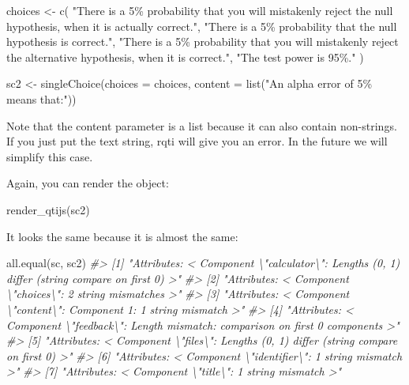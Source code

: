 \documentclass[twoside]{tufte-book}
\newenvironment{Shaded}{}{}
\newcommand{\AttributeTok}[1]{\textcolor[rgb]{0.49,0.56,0.16}{#1}}
\newcommand{\CommentTok}[1]{\textcolor[rgb]{0.38,0.63,0.69}{\textit{#1}}}
\newcommand{\FunctionTok}[1]{\textcolor[rgb]{0.02,0.16,0.49}{#1}}
\newcommand{\NormalTok}[1]{#1}
\newcommand{\OtherTok}[1]{\textcolor[rgb]{0.00,0.44,0.13}{#1}}
\newcommand{\StringTok}[1]{\textcolor[rgb]{0.25,0.44,0.63}{#1}}
\begin{document}
\begin{Shaded}
\begin{Highlighting}[]
\NormalTok{choices }\OtherTok{\textless{}{-}} \FunctionTok{c}\NormalTok{(}
  \StringTok{"There is a 5\% probability that you will mistakenly reject the null}
\StringTok{ hypothesis, when it is actually correct."}\NormalTok{,}
  \StringTok{"There is a 5\% probability that the null hypothesis is correct."}\NormalTok{,}
  \StringTok{"There is a 5\% probability that you will mistakenly reject the alternative}
\StringTok{ hypothesis, when it is correct."}\NormalTok{,}
  \StringTok{"The test power is 95\%."}
\NormalTok{)}

\NormalTok{sc2 }\OtherTok{\textless{}{-}} \FunctionTok{singleChoice}\NormalTok{(}\AttributeTok{choices =}\NormalTok{ choices, }
                    \AttributeTok{content =} \FunctionTok{list}\NormalTok{(}\StringTok{"An alpha error of 5\% means that:"}\NormalTok{))}
\end{Highlighting}
\end{Shaded}

Note that the content parameter is a list because it can also contain non-strings. If you just put the text string, rqti will give you an error. In the future we will simplify this case.

Again, you can render the object:

\begin{Shaded}
\begin{Highlighting}[]
\FunctionTok{render\_qtijs}\NormalTok{(sc2)}
\end{Highlighting}
\end{Shaded}

It looks the same because it is almost the same:

\begin{Shaded}
\begin{Highlighting}[]
\FunctionTok{all.equal}\NormalTok{(sc, sc2)}
\CommentTok{\#\textgreater{} [1] "Attributes: \textless{} Component \textbackslash{}"calculator\textbackslash{}": Lengths (0, 1) differ (string compare on first 0) \textgreater{}"}
\CommentTok{\#\textgreater{} [2] "Attributes: \textless{} Component \textbackslash{}"choices\textbackslash{}": 2 string mismatches \textgreater{}"                                 }
\CommentTok{\#\textgreater{} [3] "Attributes: \textless{} Component \textbackslash{}"content\textbackslash{}": Component 1: 1 string mismatch \textgreater{}"                      }
\CommentTok{\#\textgreater{} [4] "Attributes: \textless{} Component \textbackslash{}"feedback\textbackslash{}": Length mismatch: comparison on first 0 components \textgreater{}"  }
\CommentTok{\#\textgreater{} [5] "Attributes: \textless{} Component \textbackslash{}"files\textbackslash{}": Lengths (0, 1) differ (string compare on first 0) \textgreater{}"     }
\CommentTok{\#\textgreater{} [6] "Attributes: \textless{} Component \textbackslash{}"identifier\textbackslash{}": 1 string mismatch \textgreater{}"                                }
\CommentTok{\#\textgreater{} [7] "Attributes: \textless{} Component \textbackslash{}"title\textbackslash{}": 1 string mismatch \textgreater{}"}
\end{Highlighting}
\end{Shaded}
\end{document}
